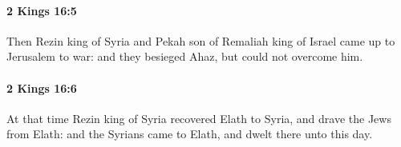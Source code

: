 		\paragraph{2 Kings 16:5} %
			\label{2KINGS-16-5}

			Then Rezin king of Syria and Pekah son of Remaliah king of Israel came up to Jerusalem to war: and they besieged Ahaz, but could not overcome him.


		\paragraph{2 Kings 16:6} %
			\label{2KINGS-16-6}

			At that time Rezin king of Syria recovered Elath to Syria, and drave the Jews from Elath: and the Syrians came to Elath, and dwelt there unto this day.


